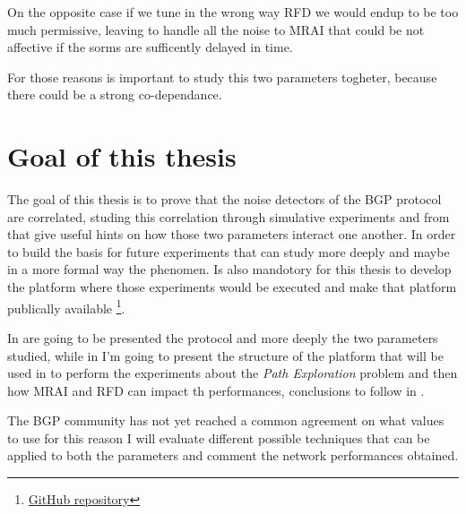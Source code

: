 On the opposite case if we tune in the wrong way \ac{RFD} we would endup to
be too much permissive, leaving to handle all the noise to \ac{MRAI} that could
be not affective if the sorms are sufficently delayed in time.

For those reasons is important to study this two parameters togheter, because
there could be a strong co-dependance.

\section{Goal of this thesis}
\label{sec:thesis_goal}


The goal of this thesis is to prove that the noise detectors of the \ac{BGP} 
protocol are correlated, studing this correlation through simulative experiments
and from that give useful hints on how those two parameters interact one another.
In order to build the basis for future experiments that can study more deeply 
and maybe in a more formal way the phenomen.
Is also mandotory for this thesis to develop the platform where those experiments
would be executed and make that platform publically available
\footnote{\href{https://github.com/tiamilani/BGPFSM}{GitHub repository}}.

In  are going to be presented the protocol and more deeply
the two parameters studied, while in  I'm going to present
the structure of the platform that will be used in  
to perform the experiments about the \textit{Path Exploration} problem and then
how \ac{MRAI} and \ac{RFD} can impact th performances, conclusions to follow
in .

The \ac{BGP} community has not yet reached a common agreement on what values 
to use for this reason I will evaluate different possible techniques that can 
be applied to both the parameters and comment the network performances obtained.
